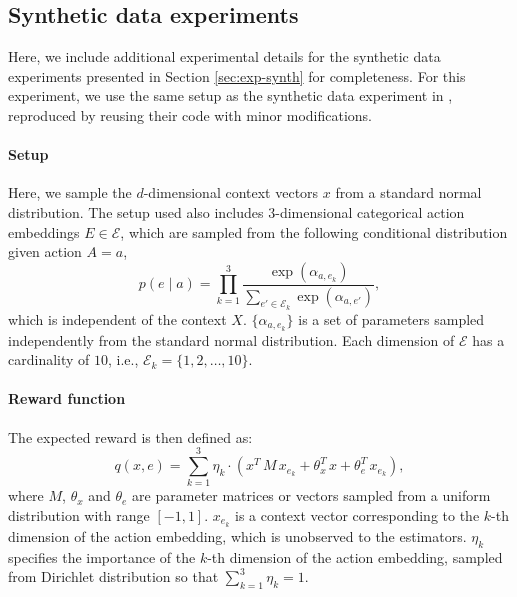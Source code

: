 \subsection{Synthetic data experiments}\label{subsec:mips-empirical}
Here, we include additional experimental details for the synthetic data experiments presented in Section \ref{sec:exp-synth} for completeness. For this experiment, we use the same setup as the synthetic data experiment in \cite{saito2022off}, reproduced by reusing their code with minor modifications. 



\paragraph{Setup}
Here, we sample the $d$-dimensional context vectors $x$ from a standard normal distribution. 
The setup used also includes $3$-dimensional categorical action embeddings $E \in \mathcal{E}$, which are sampled from the following conditional distribution given action $A=a$,
\[
p(e\mid a) = \prod_{k=1}^{3}\frac{\exp{(\alpha_{a, e_{k}})}}{\sum_{e'\in \mathcal{E}_k} \exp{(\alpha_{a, e'})}},
\]
which is independent of the context $X$. $\{\alpha_{a, e_k}\}$ is a set of parameters sampled independently from the standard normal distribution. Each dimension of $\mathcal{E}$ has a cardinality of $10$, i.e., $\mathcal{E}_k = \{1, 2, \dots, 10\}$.

\paragraph{Reward function}
The expected reward is then defined as:
\[
q(x, e) = \sum_{k=1}^{3} \eta_k \cdot (x^T\, M\, x_{e_k} + \theta_x^T\, x + \theta_e^T\, x_{e_k}),
\]
where $M$, $\theta_x$ and $\theta_e$ are parameter matrices or vectors sampled from a uniform distribution with range $[-1, 1]$. $x_{e_k}$ is a context vector corresponding to the $k$-th dimension of the action embedding, which is unobserved to the estimators. $\eta_k$ specifies the importance of the $k$-th dimension of the action embedding, sampled from Dirichlet distribution so that $\sum_{k=1}^{3} \eta_k = 1$. 

